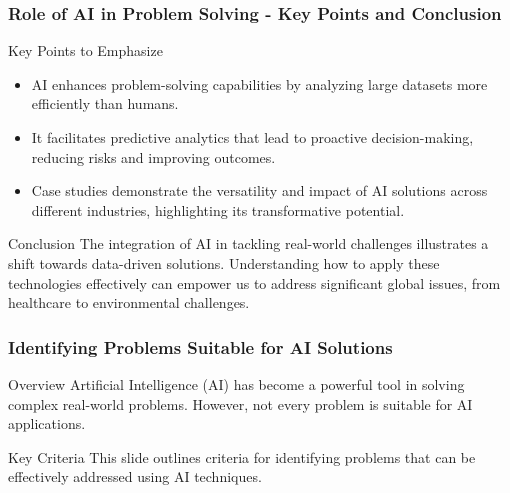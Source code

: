 \documentclass{beamer}
\begin{document}
\begin{frame}[fragile]
    \frametitle{Role of AI in Problem Solving - Key Points and Conclusion}
    \begin{block}{Key Points to Emphasize}
        \begin{itemize}
            \item AI enhances problem-solving capabilities by analyzing large datasets more efficiently than humans.
            \item It facilitates predictive analytics that lead to proactive decision-making, reducing risks and improving outcomes.
            \item Case studies demonstrate the versatility and impact of AI solutions across different industries, highlighting its transformative potential.
        \end{itemize}
    \end{block}

    \begin{block}{Conclusion}
        The integration of AI in tackling real-world challenges illustrates a shift towards data-driven solutions. Understanding how to apply these technologies effectively can empower us to address significant global issues, from healthcare to environmental challenges.
    \end{block}
\end{frame}

\begin{frame}[fragile]
    \frametitle{Identifying Problems Suitable for AI Solutions}
    \begin{block}{Overview}
        Artificial Intelligence (AI) has become a powerful tool in solving complex real-world problems. 
        However, not every problem is suitable for AI applications.
    \end{block}
    \begin{block}{Key Criteria}
        This slide outlines criteria for identifying problems that can be effectively addressed using AI techniques.
    \end{block}
\end{frame}
\end{document}

